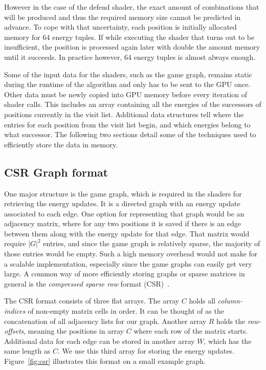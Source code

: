However in the case of the defend shader,
the exact amount of combinations that will be produced
and thus the required memory size cannot be predicted in advance.
To cope with that uncertainty,
each position is initially allocated memory for 64 energy tuples.
If while executing the shader that turns out to be insufficient,
the position is processed again later with double the amount memory until it
succeeds.
In practice however, 64 energy tuples is almost always enough.

Some of the input data for the shaders, such as the game graph,
remains static during the runtime of the algorithm
and only has to be sent to the GPU once.
Other data must be newly copied into GPU memory before every iteration of
shader calls.
This includes an array containing all the energies of the successors of
positions currently in the visit list.
Additional data structures tell where the entries for each position from the
visit list begin,
and which energies belong to what successor.
The following two sections detail some of the techniques used to efficiently
store the data in memory.


\subsection{CSR Graph format}

One major structure is the game graph,
which is required in the shaders for retrieving the energy updates.
It is a directed graph with an energy update associated to each edge.
One option for representing that graph would be an adjacency matrix,
where for any two positions it is saved if there is an edge between them
along with the energy update for that edge.
That matrix would require $|G|^2$ entries, and since the game graph is
relatively sparse, the majority of those entries would be empty.
Such a high memory overhead would not make for a scalable implementation,
especially since the game graphs can easily get very large.
A common way of more efficiently storing graphs or sparse matrices in general is
the \emph{compressed sparse row} format (CSR)~\cite{Merrill2015,Hijma2023}.

The CSR format consists of three flat arrays.
The array $C$ holds all \emph{column-indices} of non-empty matrix cells in order.
It can be thought of as the concatenation of all adjacency lists for our graph.
Another array $R$ holds the \emph{row-offsets}, meaning the positions in array
$C$ where each row of the matrix starts.
Additional data for each edge can be stored in another array $W$, which has the
same length as $C$.
We use this third array for storing the energy updates.
Figure~\ref{fig:csr} illustrates this format on a small example graph.


